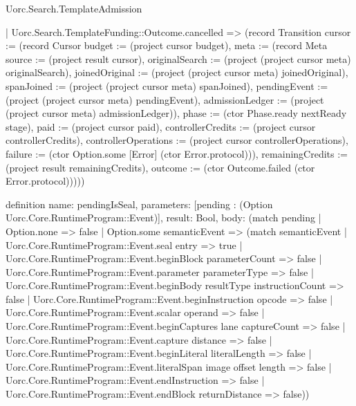\begin{lexlean}{Uorc.Search.TemplateAdmission}
\begin{semanticmodule}
{    | Uorc.Search.TemplateFunding::Outcome.cancelled => (record Transition {cursor := (record Cursor {budget := (project cursor budget), meta := (record Meta {source := (project result cursor), originalSearch := (project (project cursor meta) originalSearch), joinedOriginal := (project (project cursor meta) joinedOriginal), spanJoined := (project (project cursor meta) spanJoined), pendingEvent := (project (project cursor meta) pendingEvent), admissionLedger := (project (project cursor meta) admissionLedger)}), phase := (ctor Phase.ready nextReady stage), paid := (project cursor paid), controllerCredits := (project cursor controllerCredits), controllerOperations := (project cursor controllerOperations), failure := (ctor Option.some [Error] (ctor Error.protocol))}), remainingCredits := (project result remainingCredits), outcome := (ctor Outcome.failed (ctor Error.protocol))})))
}

definition{
  name: pendingIsSeal,
  parameters: [pending : (Option Uorc.Core.RuntimeProgram::Event)],
  result: Bool,
  body: (match pending
    | Option.none => false
    | Option.some semanticEvent => (match semanticEvent
      | Uorc.Core.RuntimeProgram::Event.seal entry => true
      | Uorc.Core.RuntimeProgram::Event.beginBlock parameterCount => false
      | Uorc.Core.RuntimeProgram::Event.parameter parameterType => false
      | Uorc.Core.RuntimeProgram::Event.beginBody resultType instructionCount => false
      | Uorc.Core.RuntimeProgram::Event.beginInstruction opcode => false
      | Uorc.Core.RuntimeProgram::Event.scalar operand => false
      | Uorc.Core.RuntimeProgram::Event.beginCaptures lane captureCount => false
      | Uorc.Core.RuntimeProgram::Event.capture distance => false
      | Uorc.Core.RuntimeProgram::Event.beginLiteral literalLength => false
      | Uorc.Core.RuntimeProgram::Event.literalSpan image offset length => false
      | Uorc.Core.RuntimeProgram::Event.endInstruction => false
      | Uorc.Core.RuntimeProgram::Event.endBlock returnDistance => false))
}


\end{semanticmodule}
\end{lexlean}
